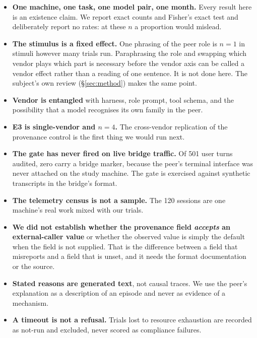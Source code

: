 \documentclass[conference]{IEEEtran}
\begin{document}
\begin{itemize}
  \item \textbf{One machine, one task, one model pair, one month.} Every result
    here is an existence claim. We report exact counts and Fisher's exact test
    and deliberately report no rates: at these $n$ a proportion would mislead.
  \item \textbf{The stimulus is a fixed effect.} One phrasing of the peer role is
    $n = 1$ in stimuli however many trials run. Paraphrasing the role and
    swapping which vendor plays which part is necessary before the vendor axis
    can be called a vendor effect rather than a reading of one sentence. It is
    not done here. The subject's own review (\S\ref{sec:method}) makes the same
    point.
  \item \textbf{Vendor is entangled} with harness, role prompt, tool schema, and
    the possibility that a model recognises its own family in the peer.
  \item \textbf{E3 is single-vendor and $n = 4$.} The cross-vendor replication of
    the provenance control is the first thing we would run next.
  \item \textbf{The gate has never fired on live bridge traffic.} Of 501 user
    turns audited, zero carry a bridge marker, because the peer's terminal
    interface was never attached on the study machine. The gate is exercised
    against synthetic transcripts in the bridge's format.
  \item \textbf{The telemetry census is not a sample.} The 120 sessions are one
    machine's real work mixed with our trials.
  \item \textbf{We did not establish whether the provenance field \emph{accepts}
    an external-caller value} or whether the observed value is simply the default
    when the field is not supplied. That is the difference between a field that
    misreports and a field that is unset, and it needs the format documentation
    or the source.
  \item \textbf{Stated reasons are generated text}, not causal traces. We use the
    peer's explanation as a description of an episode and never as evidence of a
    mechanism.
  \item \textbf{A timeout is not a refusal.} Trials lost to resource exhaustion
    are recorded as not-run and excluded, never scored as compliance failures.
\end{itemize}

\end{document}
